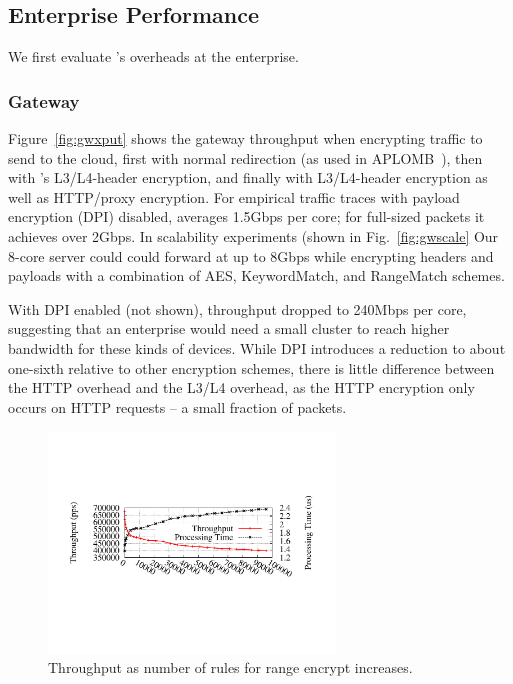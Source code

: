 \subsection{Enterprise Performance}
\label{sec:enterprise}
We first evaluate \sys's overheads at the enterprise. %

\subsubsection{Gateway}

 
Figure~\ref{fig:gwxput} shows the gateway throughput when encrypting traffic to send to the cloud, first with normal redirection (as used in APLOMB~\cite{aplomb}), then with \sys's L3/L4-header encryption, and finally with L3/L4-header encryption as well as HTTP/proxy encryption. 
For empirical traffic traces with payload encryption (DPI) disabled, \sys averages 1.5Gbps per core; for full-sized packets it achieves over 2Gbps.
In scalability experiments (shown in Fig.~\ref{fig:gwscale} Our 8-core server could could forward at up to 8Gbps while encrypting headers and payloads with a combination of AES, KeywordMatch, and RangeMatch schemes.

With DPI enabled (not shown), throughput dropped to 240Mbps per core, suggesting that an enterprise would need a small cluster to reach higher bandwidth for these kinds of devices.
While DPI introduces a reduction to about one-sixth relative to other encryption schemes, there is little difference between the HTTP overhead and the L3/L4 overhead, as the HTTP encryption only occurs on HTTP requests -- a small fraction of packets. 

\begin{figure}[t]
  \centering
  \includegraphics[width=3in]{fig/xputrange}
  \caption[]{\label{fig:xputrange} Throughput as number of rules for range encrypt increases.}
\end{figure}


